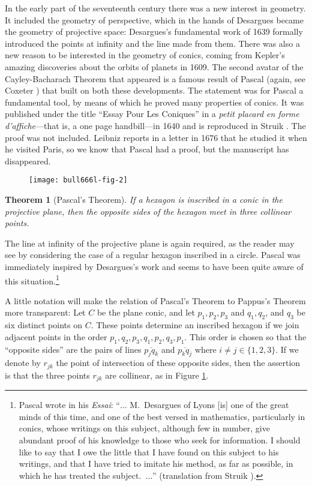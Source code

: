 \documentclass{bull-l}
\theoremstyle{pplain}
\newtheorem{thmcb}{Theorem}
\theoremstyle{definition}
\begin{document}
In the early part of the seventeenth century there was a new interest in
geometry.  It included the geometry of perspective, which in the hands of
Desargues became the geometry of projective space: Desargues's fundamental work
of 1639 formally introduced the points at infinity and the line made from them.
There was also a new reason to be interested in the geometry of conics, coming
from Kepler's amazing discoveries about the orbits of planets in 1609.  The
second avatar of the Cayley-Bacharach Theorem that appeared is a famous result
of Pascal (again, see Coxeter \cite{Co}) that built on both these developments. 
The statement was for Pascal a fundamental tool, by means of which he proved
many properties of conics.  It was published under the title ``Essay Pour Les
Coniques'' in a \emph{petit placard en forme d'affiche}---that is, a one page
handbill---in 1640 and is reproduced in Struik \cite{S}.  The proof was
not included.  Leibniz reports in a letter in 1676 that he studied it when he
visited Paris, so we know that Pascal had a proof, but the manuscript has
disappeared.

\begin{figure}[t]
\texttt{[image: bull666l-fig-2]}
\caption{}\label{fig:two}
\end{figure}

\begin{thmcb}[Pascal's Theorem] \label{thmcb2}
If a hexagon is inscribed in a conic in the projective plane, then the opposite
sides of the hexagon meet in three collinear points.
\end{thmcb}

The line at infinity of the projective plane is again required, as the
reader may see by considering the case of a regular hexagon inscribed in a
circle.  Pascal was immediately inspired by Desargues's work and seems to have
been quite aware of this situation.\footnote{Pascal wrote in his \emph{Essai}: 
``$\dots$ M.\ Desargues of Lyons [is] one of the great minds of this time, and
one of the best versed in mathematics, particularly in conics, whose writings
on this subject, although few in number, give abundant proof of his knowledge to
those who seek for information.  I should like to say that I owe the little
that I have found on this subject to his writings, and that I have tried
to imitate his method, as far as possible, in which he has treated the 
subject.\ $\dots$'' (translation from Struik \cite{S}).}

A little notation will make the relation of Pascal's Theorem to Pappus's 
Theorem more transparent: Let $C$ be the plane conic, and let $p_1,p_2,p_3$ and
$q_1,q_2$, and $q_3$ be six distinct points on $C$.  These points determine an
inscribed hexagon if we join adjacent points in the order
$p_1,q_2,p_3,q_1,p_2,q_3,p_1$.  This order is chosen so that the ``opposite
sides'' are the pairs of lines $\overline{p_jq_k}$ and $\overline{p_kq_j}$
where $i\ne j\in\{1,2,3\}$.  If we denote by $r_{jk}$ the point of intersection
of these opposite sides, then the assertion is that the three points $r_{jk}$
are collinear, as in Figure \ref{fig:two}.
\end{document}

